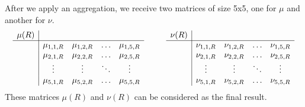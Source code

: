 \documentclass[12pt, a4paper]{article}
\begin{document}
After we apply an aggregation, we receive two matrices of size 5x5, one for $\mu$ and another for $\nu$.
\[ \begin{array}{c|cccc cc c|cccc}
\mu(R) & & & & & & & \nu(R) & & & & \\
\cline{1-5} \cline{8-12}
& \mu_{1,1,R} & \mu_{1,2,R} & \ldots & \mu_{1,5,R} & \mbox{ } & \mbox{ } & & \nu_{1,1,R} & \nu_{1,2,R} & \ldots & \nu_{1,5,R} \\
& \mu_{2,1,R} & \mu_{2,2,R} & \ldots & \mu_{2,5,R} & \mbox{ } & \mbox{ } & & \nu_{2,1,R} & \nu_{2,2,R} & \ldots & \nu_{2,5,R} \\
& \vdots & \vdots & \ddots & \vdots & \mbox{ } & \mbox{ } & & \vdots & \vdots & \ddots & \vdots \\
& \mu_{5,1,R} & \mu_{5,2,R} & \ldots & \mu_{5,5,R} & \mbox{ } & \mbox{ } & & \nu_{5,1,R} & \nu_{5,2,R} & \ldots & \nu_{5,5,R}
\end{array} \]
These matrices $\mu(R)$ and $\nu(R)$ can be considered as the final result.
\end{document}
